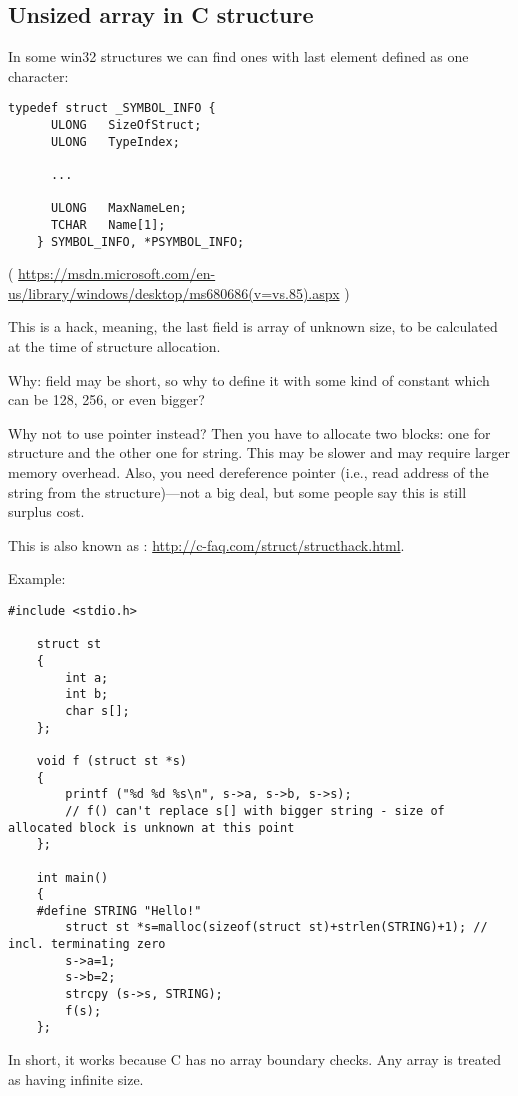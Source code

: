 \subsection{Unsized array in C structure}

In some win32 structures we can find ones with last element defined as one character:

\begin{lstlisting}[style=customc]
	typedef struct _SYMBOL_INFO {
	  ULONG   SizeOfStruct;
	  ULONG   TypeIndex;
	  
	  ...
	
	  ULONG   MaxNameLen;
	  TCHAR   Name[1];
	} SYMBOL_INFO, *PSYMBOL_INFO;
\end{lstlisting}

( \url{https://msdn.microsoft.com/en-us/library/windows/desktop/ms680686(v=vs.85).aspx} )

This is a hack, meaning, the last field is array of unknown size, to be calculated at the time of structure allocation.

Why:  field may be short, so why to define it with some kind of 
constant which can be 128, 256, or even bigger?

Why not to use pointer instead? Then you have to allocate two blocks: one for structure and the other one for string.
This may be slower and may require larger memory overhead.
Also, you need dereference pointer (i.e., read address of the string from the structure)---not a big deal, but some
people say this is still surplus cost.

This is also known as : \url{http://c-faq.com/struct/structhack.html}.

Example:

\begin{lstlisting}[style=customc]
	#include <stdio.h>

	struct st
	{
		int a;
		int b;
		char s[];
	};

	void f (struct st *s)
	{
		printf ("%d %d %s\n", s->a, s->b, s->s);
		// f() can't replace s[] with bigger string - size of allocated block is unknown at this point
	};

	int main()
	{
	#define STRING "Hello!"
		struct st *s=malloc(sizeof(struct st)+strlen(STRING)+1); // incl. terminating zero
		s->a=1;
		s->b=2;
		strcpy (s->s, STRING);
		f(s);
	};
\end{lstlisting}

In short, it works because C has no array boundary checks. Any array is treated as having infinite size.

